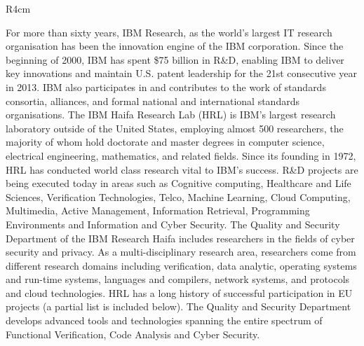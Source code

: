 \documentclass[a4paper,11pt]{article}
\begin{document}

\begin{wrapfigure}{R}{4cm}
\vspace{-2cm}
\hfill {}
\vspace{-1cm}
\end{wrapfigure}

\vspace{24pt}
For more than sixty years, IBM Research, as the world's largest IT research organisation has been the innovation engine of the IBM corporation. Since the beginning of 2000, IBM has spent \$75 billion in R\&D, enabling IBM to deliver key innovations and maintain U.S. patent leadership for the 21st consecutive
year in 2013.
IBM also participates in and contributes to the work of standards consortia, alliances, and formal national and international standards organisations. 
The IBM Haifa Research Lab (HRL) is IBM's largest research laboratory outside of the United States, 
employing almost 500 researchers, the majority of whom hold doctorate and master degrees in computer science, electrical engineering, mathematics, and related fields. Since its founding in 1972, HRL has conducted world class research vital to IBM's success. R\&D projects are being executed today in areas such as Cognitive computing, Healthcare and Life Sciences, Verification Technologies, Telco, Machine Learning, Cloud Computing, Multimedia, Active Management, Information Retrieval, Programming Environments and Information and Cyber Security. The Quality and Security Department of the IBM Research Haifa includes researchers in the fields of cyber security and privacy. As a multi-disciplinary research area, researchers come from different research domains including verification, data analytic, operating systems and run-time systems, languages and compilers, network systems, and protocols and cloud technologies.
HRL has a long history of successful participation in EU projects (a partial list is included below). 
%
The Quality and Security Department develops advanced tools and technologies spanning the entire spectrum of Functional Verification, Code Analysis and Cyber Security.
\end{document}
